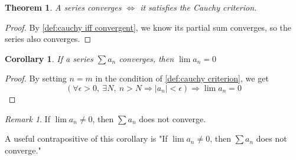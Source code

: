 \documentclass[12pt, lettersize]{book}
\theoremstyle{plain}
\newtheorem{thm}{Theorem}[section]
\newtheorem{cor}{Corollary}[thm]
\theoremstyle{definition}
\theoremstyle{remark}
\newtheorem*{rem}{Remark}
\begin{document}
	\begin{thm}
		A series converges $\iff$ it satisfies the Cauchy criterion. 
	\end{thm}
	\begin{proof}
		By \ref{def:cauchy iff convergent}, we know its partial sum converges, so the series also converges.
	\end{proof}
	\begin{cor}\label{def:If a_n converges then lim(a_n)=0}
		If a series $\sum a_n$ converges, then $\lim a_n=0$
	\end{cor}
	\begin{proof}
		By setting $n=m$ in the condition of \ref{def:cauchy criterion}, we get
		\begin{displaymath}
			\left(\forall\epsilon>0,\ \exists N,\ n>N\Rightarrow\left|a_n\right|<\epsilon\right)\Rightarrow\lim a_n=0
		\end{displaymath}
	\end{proof}
	\begin{rem}
		If $\lim a_n\neq0$, then $\sum a_n$ does not converge.
	\end{rem}
	A useful contrapositive of this corollary is "If $\lim a_n\neq0$, then $\sum a_n$ does not converge."
	
\end{document}
